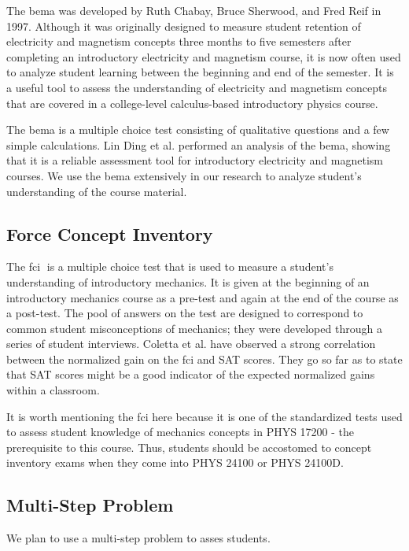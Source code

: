 The \gls{bema} was developed by Ruth Chabay, Bruce Sherwood, and Fred Reif in 1997. Although it was originally designed to measure student retention of electricity and magnetism concepts three months to five semesters after completing an introductory electricity and magnetism course, it is now often used to analyze student learning between the beginning and end of the semester. It is a useful tool to assess the understanding of electricity and magnetism concepts that are covered in a college-level calculus-based introductory physics course\cite{ding2006}.

The \gls{bema} is a multiple choice test consisting of qualitative questions and a few simple calculations. Lin Ding et al. performed an analysis of the \gls{bema}, showing that it is a reliable assessment tool for introductory electricity and magnetism courses\cite{ding2006}. We use the \gls{bema} extensively in our research to analyze student's understanding of the course material.

\subsection{Force Concept Inventory}

The \gls{fci}􏰁 is a multiple choice test that is used to measure a student's understanding of introductory mechanics. It is given at the beginning of an introductory mechanics course as a pre-test and again at the end of the course as a post-test. The pool of answers on the test are designed to correspond to common student misconceptions of mechanics; they were developed through a series of student interviews\cite{hestenes1992}. Coletta et al. have observed a strong correlation between the normalized gain on the \gls{fci} and SAT scores. They go so far as to state that SAT scores might be a good indicator of the expected normalized gains within a classroom\cite{coletta2007}.

It is worth mentioning the \gls{fci} here because it is one of the standardized tests used to assess student knowledge of mechanics concepts in PHYS 17200 - the prerequisite to this course. Thus, students should be accostomed to concept inventory exams when they come into PHYS 24100 or PHYS 24100D.

\subsection{Multi-Step Problem}

We plan to use a multi-step problem to asses students\cite{sherwood2005, chabay2014}.


